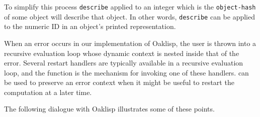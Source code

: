To simplify this process \texttt{describe} applied to an integer which is
the \texttt{object-hash} of some object will describe that object.  In
other words, \texttt{describe} can be applied to the numeric ID in an
object's printed representation.




When an error occurs in our implementation of Oaklisp, the
user is thrown into a recursive evaluation loop whose dynamic context
is nested inside that of the error.  Several restart handlers are
typically available in a recursive evaluation loop, and the 
function is the mechanism for invoking one of these handlers.
 can be used to preserve an error context when it might
be useful to restart the computation at a later time.



The following dialogue with Oaklisp illustrates some of these
points.

